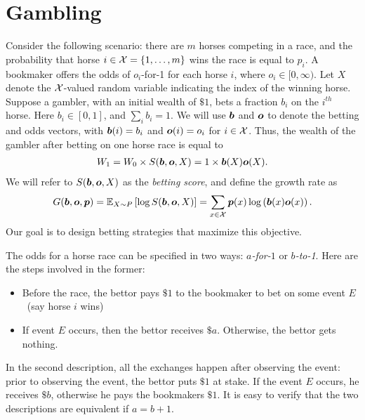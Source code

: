 \section{Gambling} 
\label{sec:gambling}
    Consider the following scenario: there are $m$ horses competing in a race, and the probability that horse $i \in \mathcal{X} = \{1, \ldots, m\}$ wins the race is equal to $p_i$. A bookmaker offers the odds of $o_i$-for-1 for each horse $i$, where $o_i \in [0, \infty)$. Let $X$ denote the $\mathcal{X}$-valued random variable indicating the index of the winning horse. Suppose a gambler, with an initial wealth of $\$1$, bets a fraction $b_i$ on the $i^{th}$ horse. Here $b_i \in [0,1]$, and $\sum_{i}b_i=1$. We will use $\boldsymbol{b}$ and $\boldsymbol{o}$ to denote the betting and odds vectors, with $\boldsymbol{b}(i)=b_i$ and $\boldsymbol{o}(i)=o_i$ for $i \in \mathcal{X}$. Thus, the wealth of the gambler after betting on one horse race is equal to 
    \begin{align}
        W_1 = W_0 \times S(\boldsymbol{b}, \boldsymbol{o}, X) = 1 \times \boldsymbol{b}(X) \boldsymbol{o}(X). 
    \end{align}
    We will refer to $S(\boldsymbol{b}, \boldsymbol{o}, X)$ as the \emph{betting score}, and define the growth rate as 
    \begin{align}
        G(\boldsymbol{b}, \boldsymbol{o}, \boldsymbol{p}) = \mathbb{E}_{X \sim P}\left[ \log S(\boldsymbol{b}, \boldsymbol{o}, X) \right] = \sum_{x \in \mathcal{X}} \boldsymbol{p}(x) \log \left( \boldsymbol{b}(x) \boldsymbol{o}(x) \right).  \label{eq:growth-rate-horse-races}
    \end{align}
    Our goal is to design betting strategies that maximize this objective. 
    \begin{remark}
        \label{remark:betting-nomenclature} The odds for a horse race can be specified in two ways: \emph{$a$-for-$1$} or \emph{$b$-to-1}. Here are the steps involved in the former: 
        \begin{itemize}
            \item Before the race, the bettor pays $\$1$ to the bookmaker to bet on some event $E$~(say horse $i$ wins)
            \item If event $E$ occurs, then the bettor receives $\$a$. Otherwise, the bettor gets nothing. 
        \end{itemize}
        In the second description, all the exchanges happen after observing the event: prior to observing the event, the bettor puts $\$1$ at stake. If the event $E$ occurs, he receives $\$b$, otherwise he pays the bookmakers $\$1$. 
        It is easy to verify that the two descriptions are equivalent if $a = b+1$. 
    \end{remark}
